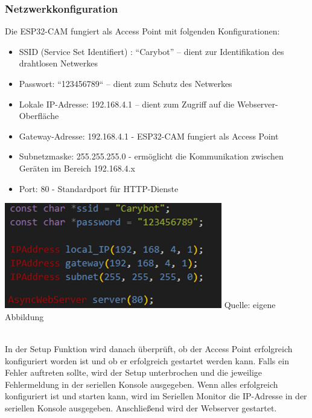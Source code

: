 \documentclass[ngerman,12pt,a4paper]{article}
\begin{document}
	\subsubsection*{Netzwerkkonfiguration}
	Die ESP32-CAM fungiert als Access Point mit folgenden Konfigurationen:
	
	\begin{itemize}
		\item SSID (Service Set Identifiert) : “Carybot” – dient zur Identifikation des drahtlosen Netwerkes
		\item Passwort: “123456789“ – dient zum Schutz des Netwerkes
		\item Lokale IP-Adresse: 192.168.4.1 – dient zum Zugriff auf die Webserver-Oberfläche
		\item Gateway-Adresse: 192.168.4.1 - ESP32-CAM fungiert als Access Point
		\item Subnetzmaske: 255.255.255.0 - ermöglicht die Kommunikation zwischen Geräten im Bereich 192.168.4.x
		\item Port: 80 - Standardport für HTTP-Dienste
	\end{itemize} 
	\begin{minipage}{\textwidth}
		\centering
		\includegraphics[scale=1]{Pictures/server-config}
		\label{fig:server-config}
		\vspace{-2pt}
		\small Quelle: eigene Abbildung
	\end{minipage} \\[0.75cm]
	In der Setup Funktion wird danach überprüft, ob der Access Point erfolgreich konfiguriert worden ist und ob er erfolgreich gestartet werden kann. Falls ein Fehler auftreten sollte, wird der Setup unterbrochen und die jeweilige Fehlermeldung in der seriellen Konsole ausgegeben. Wenn alles erfolgreich konfiguriert ist und starten kann, wird im Seriellen Monitor die IP-Adresse in der seriellen Konsole ausgegeben. Anschließend wird der Webserver gestartet. \\[0.5cm]
\end{document}
